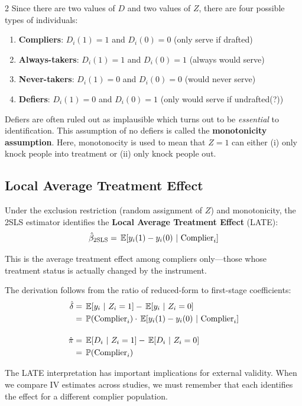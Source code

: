 \documentclass[12pt]{article}
\begin{document}
\begin{multicols}{2}
Since there are two values of $D$ and two values of $Z$, there are four possible types of individuals:
\begin{enumerate}
  \item \textbf{Compliers}: $D_i(1) = 1$ and $D_i(0) = 0$ (only serve if drafted)
  \item \textbf{Always-takers}: $D_i(1) = 1$ and $D_i(0) = 1$ (always would serve)
  \item \textbf{Never-takers}: $D_i(1) = 0$ and $D_i(0) = 0$ (would never serve)
  \item \textbf{Defiers}: $D_i(1) = 0$ and $D_i(0) = 1$ (only would serve if undrafted(?))
\end{enumerate}

Defiers are often ruled out as implausible which turns out to be \emph{essential} to identification.
This assumption of no defiers is called the \textbf{monotonicity assumption}.
Here, monotonocity is used to mean that $Z = 1$ can either (i) only knock people into treatment or (ii) only knock people out.


\subsection*{Local Average Treatment Effect}

Under the exclusion restriction (random assignment of $Z$) and monotonicity, the 2SLS estimator identifies the \textbf{Local Average Treatment Effect} (LATE):
$$
  \hat{\beta}_{\text{2SLS}} = \expec{y_i(1) - y_i(0)}{\text{Complier}_i}
$$

This is the average treatment effect among compliers only---those whose treatment status is actually changed by the instrument.

The derivation follows from the ratio of reduced-form to first-stage coefficients:
\begin{align*}
  \hat{\delta} 
  &= \expec{y_i}{Z_i = 1} - \expec{y_i}{Z_i = 0} \\
  &= \prob{\text{Complier}_i} \cdot \expec{y_i(1) - y_i(0)}{\text{Complier}_i} \\[4mm]
  \hat{\pi} &= \expec{D_i}{Z_i = 1} - \expec{D_i}{Z_i = 0} \\
  &= \prob{\text{Complier}_i}
\end{align*}

The LATE interpretation has important implications for external validity.
When we compare IV estimates across studies, we must remember that each identifies the effect for a different complier population.


\end{multicols}
\end{document}
